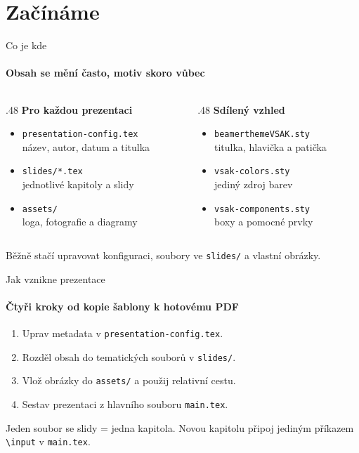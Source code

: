 \section{Začínáme}

\begin{frame}{Co je kde}
  \framesubtitle{Obsah se mění často, motiv skoro vůbec}
  \begin{columns}[T,totalwidth=\textwidth]
    \begin{column}{.48\textwidth}
      \textbf{Pro každou prezentaci}
      \begin{itemize}
        \item \texttt{presentation-config.tex}\\ název, autor, datum a titulka
        \item \texttt{slides/*.tex}\\ jednotlivé kapitoly a slidy
        \item \texttt{assets/}\\ loga, fotografie a diagramy
      \end{itemize}
    \end{column}
    \begin{column}{.48\textwidth}
      \textbf{Sdílený vzhled}
      \begin{itemize}
        \item \texttt{beamerthemeVSAK.sty}\\ titulka, hlavička a patička
        \item \texttt{vsak-colors.sty}\\ jediný zdroj barev
        \item \texttt{vsak-components.sty}\\ boxy a pomocné prvky
      \end{itemize}
    \end{column}
  \end{columns}
  \begin{Tip}
    Běžně stačí upravovat konfiguraci, soubory ve \texttt{slides/} a vlastní obrázky.
  \end{Tip}
\end{frame}

\begin{frame}{Jak vznikne prezentace}
  \framesubtitle{Čtyři kroky od kopie šablony k hotovému PDF}
  \begin{enumerate}
    \item Uprav metadata v \texttt{presentation-config.tex}.
    \item Rozděl obsah do tematických souborů v \texttt{slides/}.
    \item Vlož obrázky do \texttt{assets/} a použij relativní cestu.
    \item Sestav prezentaci z hlavního souboru \texttt{main.tex}.
  \end{enumerate}
  \vspace{4mm}
  \begin{Rule}
    Jeden soubor se slidy = jedna kapitola. Novou kapitolu připoj jediným příkazem \texttt{\textbackslash input} v \texttt{main.tex}.
  \end{Rule}
\end{frame}
